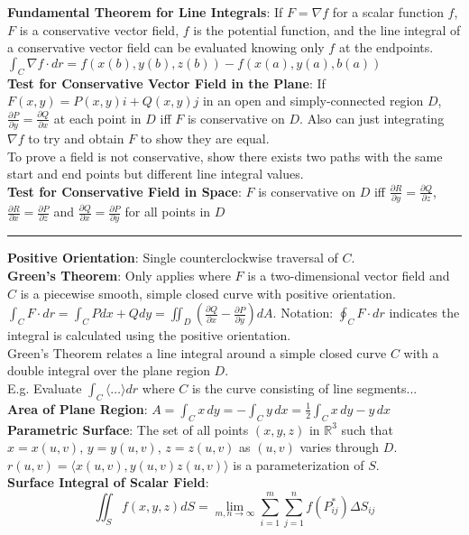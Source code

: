 \documentclass{article}
\begin{document}
{\begin{multicols*}{3}
\textbf{Fundamental Theorem for Line Integrals}: If $F=\nabla f$ for a scalar function $f$, $F$ is a conservative vector field, $f$ is the potential function, and the line integral of a conservative vector field can be evaluated knowing only $f$ at the endpoints.\\
$\int_C\nabla f\cdot dr=f(x(b),y(b),z(b))-f(x(a),y(a),b(a))$\\
\textbf{Test for Conservative Vector Field in the Plane}: If $F(x,y)=P(x,y)i+Q(x,y)j$ in an open and simply-connected region $D$, $\frac{\partial P}{\partial y}=\frac{\partial Q}{\partial x}$ at each point in $D$ iff $F$ is conservative on $D$. Also can just integrating $\nabla f$ to try and obtain $F$ to show they are equal. \\
To prove a field is not conservative, show there exists two paths with the same start and end points but different line integral values.\\
\textbf{Test for Conservative Field in Space}: $F$ is conservative on $D$ iff $\frac{\partial R}{\partial y}=\frac{\partial Q}{\partial z}$, $\frac{\partial R}{\partial x}=\frac{\partial P}{\partial z}$ and $\frac{\partial Q}{\partial x}=\frac{\partial P}{\partial y}$ for all points in $D$\\
\rule{193pt}{0.2pt}
\textbf{Positive Orientation}: Single counterclockwise traversal of $C$. \\
\textbf{Green's Theorem}: Only applies where $F$ is a two-dimensional vector field and $C$ is a piecewise smooth, simple closed curve with positive orientation. $\int_CF\cdot dr=\int_CPdx+Qdy=\iint_D(\frac{\partial Q}{\partial x}-\frac{\partial P}{\partial y})dA$. Notation: $\oint_CF\cdot dr$ indicates the integral is calculated using the positive orientation. \\
Green's Theorem relates a line integral around a simple closed curve $C$ with a double integral over the plane region $D$.\\
E.g. Evaluate $\int_C\langle\dots\rangle dr$ where $C$ is the curve consisting of line segments...\\
\textbf{Area of Plane Region}: $A=\int_Cx\,dy=-\int_Cy\,dx=\frac{1}{2}\int_Cx\,dy-y\,dx$ \\
\textbf{Parametric Surface}: The set of all points $(x,y,z)$ in $\mathbb{R}^3$ such that $x=x(u,v)$, $y=y(u,v)$, $z=z(u,v)$ as $(u,v)$ varies through $D$. $r(u,v)=\langle x(u,v),y(u,v)z(u,v)\rangle$ is a parameterization of $S$.\\
\textbf{Surface Integral of Scalar Field}: 
$$\iint_Sf(x,y,z)dS=\lim_{m,n\to\infty}\sum_{i=1}^m\sum_{j=1}^nf(P_{ij}^*)\Delta S_{ij}$$

\end{multicols*}}
\end{document}

